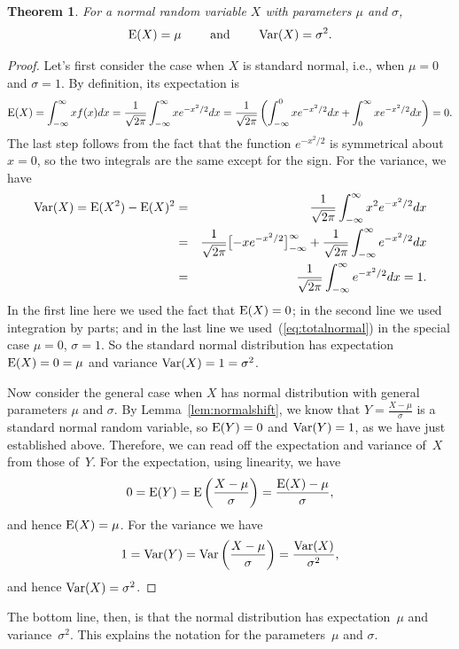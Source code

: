 \documentclass[11pt]{article}
\def\Ex#1{{\rm E}(#1)}
\def\Var#1{{\rm Var}(#1)}
\newcounter{thm}
\newtheorem{theorem}{Theorem}[thm]
\begin{document}
\begin{theorem}
For a normal random variable $X$ with parameters $\mu$ and $\sigma$,
$$\Ex{X} = \mu \qquad \text { and } \qquad \Var{X} = \sigma^2.$$
\end{theorem}
\begin{proof}
Let's first consider the case when $X$ is standard normal, i.e., when $\mu = 0$ and $\sigma = 1$.
By definition, its expectation is $$
   \Ex{X} = \int_{-\infty}^\infty xf(x)dx = \frac{1}{\sqrt{2\pi}}\int_{-\infty}^\infty x e^{-x^2/2} dx =
           \frac{1}{\sqrt{2\pi}}\left(\int_{-\infty}^0 x e^{-x^2/2} dx +\int_{0}^\infty x e^{-x^2/2} dx \right) = 0.  $$
The last step follows from the fact that the function $e^{-x^2/2}$ is symmetrical about $x=0$,
so the two integrals are the same except for the sign.  For the variance, we have
\begin{eqnarray*}
   \Var{X} = \Ex{X^2} - \Ex{X}^2 &=& \frac{1}{\sqrt{2\pi}}\int_{-\infty}^\infty x^2 e^{-x^2/2} dx \\
                &=& \frac{1}{\sqrt{2\pi}}\bigl[-xe^{-x^2/2}\bigr]_{-\infty}^\infty
                        + \frac{1}{\sqrt{2\pi}}\int_{-\infty}^\infty e^{-x^2/2} dx \\
                &=& \frac{1}{\sqrt{2\pi}} \int_{-\infty}^\infty e^{-x^2/2} dx = 1.
\end{eqnarray*}
In the first line here we used the fact that $\Ex{X}=0$; in the second line we used integration
by parts; and in the last line we used~(\ref{eq:totalnormal}) in the special case $\mu=0$, $\sigma=1$.
So the standard normal distribution has expectation $\Ex{X}=0=\mu$ and variance
$\Var{X}=1=\sigma^2$.

Now consider the general case when $X$ has normal distribution with general parameters
$\mu$ and $\sigma$. By Lemma~\ref{lem:normalshift}, we know that $Y = \frac{X-\mu}{\sigma}$
is a standard normal random variable, so $\Ex{Y} = 0$ and $\Var{Y} = 1$, as we have just established above.
Therefore, we can read off the expectation and variance of~$X$ from those of~$Y$.  For the
expectation, using linearity, we have $$
   0 = \Ex{Y} = \hbox{\rm E}\left(\frac{X-\mu}{\sigma}\right) = \frac{\Ex{X}-\mu}{\sigma},  $$
and hence $\Ex{X} = \mu$.   For the variance we have $$
   1 = \Var{Y} = \hbox{\rm Var}\left(\frac{X-\mu}{\sigma}\right) = \frac{\Var{X}}{\sigma^2},  $$
and hence $\Var{X}=\sigma^2$.
\end{proof}

The bottom line, then, is that the normal distribution has expectation~$\mu$ and
variance~$\sigma^2$. This explains the notation for the parameters~$\mu$ and $\sigma$.
\end{document}

